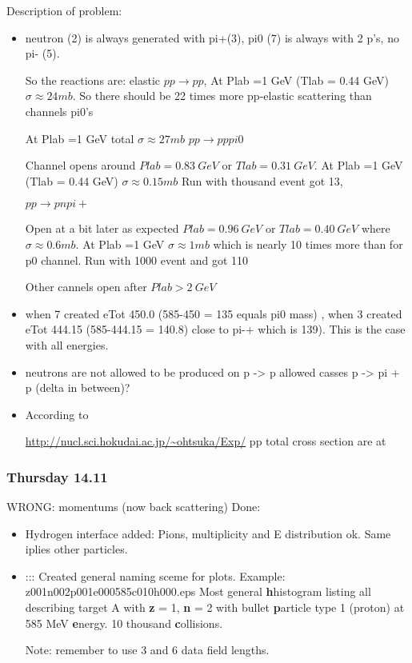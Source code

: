 Description of problem:

\begin{itemize}
  
\item neutron (2) is always generated with pi+(3), pi0 (7) is always with 2
  p's, no pi- (5). 

So the reactions are: elastic $p p \rightarrow pp$, 
At Plab =1 GeV (Tlab = 0.44 GeV)  $\sigma \approx 24mb $.
So there should be 22 times more pp-elastic scattering
 than channels pi0's

At Plab =1 GeV total $\sigma \approx 27mb $
$p p \rightarrow p p pi0$ 

Channel opens around  $Plab = 0.83~GeV$ or $Tlab = 0.31~GeV$. 
At Plab =1 GeV (Tlab = 0.44 GeV)  $\sigma \approx 0.15mb $
Run with thousand event got 13,

$p p \rightarrow p n pi+$ 

Open at a bit later as expected $Plab = 0.96~GeV$ or $Tlab = 0.40~GeV$ where $\sigma \approx 0.6 mb$. 
At Plab =1 GeV  $\sigma \approx 1mb $ which is nearly 10 times more than for p0 channel.
Run with 1000 event and got 110

  Other cannels open after $Plab > 2~GeV$
  
\item when 7 created eTot 450.0 (585-450 = 135 equals pi0 mass) , when
  3 created eTot 444.15 (585-444.15 = 140.8) close to pi-+ which is
  139). This is the case with all energies.
\item neutrons are not allowed to be produced on p -> p allowed casses
  p -> pi + p (delta in between)?
\item According to
  
  \url{http://nucl.sci.hokudai.ac.jp/~ohtsuka/Exp/} pp
  total cross section are at

\end{itemize}

\subsubsection{Thursday 14.11}


WRONG: momentums (now back scattering) Done:

\begin{itemize}
  
\item Hydrogen interface added: Pions, multiplicity and E distribution
  ok.  Same iplies other particles.
  
\item ::: Created general naming sceme for plots.  Example: {\sf
    z001n002p001e000585c010h000.eps} Most general {\bf h}histogram
  listing all describing target A with {\bf z} = 1, {\bf n} = 2 with
  bullet {\bf p}article type 1 (proton) at 585 MeV {\bf e}nergy. 10
  thousand {\bf c}ollisions.
  
  Note: remember to use 3 and 6 data field lengths.

\end{itemize}

